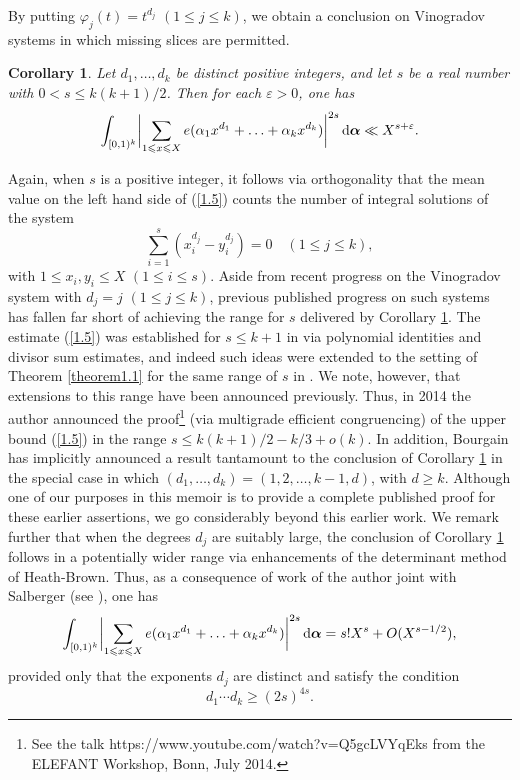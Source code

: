 \documentclass[12pt,reqno]{amsart}
\newtheorem{corollary}[theorem]{Corollary}
\theoremstyle{definition}
\theoremstyle{remark}
\numberwithin{equation}{section}
\def\alp{{\alpha}} \def\bfalp{{\boldsymbol \alpha}}
\def\eps{\varepsilon}
\def\le{\leqslant} \def\ge{\geqslant} \def\pleq{\preccurlyeq} \def\ple{\prec}
\def\d{{\,{\rm d}}}
\begin{document}
By putting $\varphi_j(t)=t^{d_j}$ $(1\le j\le k)$, we obtain a conclusion on Vinogradov 
systems in which missing slices are permitted.

\begin{corollary}\label{corollary1.2} Let $d_1,\ldots ,d_k$ be distinct positive integers, and 
let $s$ be a real number with $0<s\le k(k+1)/2$. Then for each $\eps>0$, one has
\begin{equation}\label{1.5}
\int_{[0,1)^k}\biggl| \sum_{1\le x\le X}e(\alp_1x^{d_1}+\ldots +\alp_kx^{d_k})
\biggr|^{2s}\d\bfalp \ll X^{s+\eps}.
\end{equation}
\end{corollary}

Again, when $s$ is a positive integer, it follows via orthogonality that the mean value on 
the left hand side of (\ref{1.5}) counts the number of integral solutions of the system
$$\sum_{i=1}^s(x_i^{d_j}-y_i^{d_j})=0\quad (1\le j\le k),$$
with $1\le x_i,y_i\le X$ $(1\le i\le s)$. Aside from recent progress on the Vinogradov 
system with $d_j=j$ $(1\le j\le k)$, previous published progress on such systems has 
fallen far short of achieving the range for $s$ delivered by Corollary \ref{corollary1.2}. The 
estimate (\ref{1.5}) was established for $s\le k+1$ in \cite[Theorem 1]{Woo1993} via 
polynomial identities and divisor sum estimates, and indeed such ideas were extended to 
the setting of Theorem \ref{theorem1.1} for the same range of $s$ in 
\cite[Theorem 1]{PW2002}. We note, however, that extensions to this range have been 
announced previously. Thus, in 2014 the author announced the proof\footnote{See the 
talk https://www.youtube.com/watch?v=Q5gcLVYqEks from the ELEFANT Workshop, Bonn, 
July 2014.} (via multigrade efficient congruencing) of the upper bound (\ref{1.5}) in the 
range $s\le k(k+1)/2-k/3+o(k)$. In addition, Bourgain \cite[equation (6.6)]{Bou2017} has 
implicitly announced a result tantamount to the conclusion of Corollary \ref{corollary1.2} in 
the special case in which $(d_1,\ldots ,d_k)=(1,2,\ldots ,k-1,d)$, with $d\ge k$. Although 
one of our purposes in this memoir is to provide a complete published proof for these 
earlier assertions, we go considerably beyond this earlier work. We remark further that 
when the degrees $d_j$ are suitably large, the conclusion of Corollary \ref{corollary1.2} 
follows in a potentially wider range via enhancements of the determinant method of 
Heath-Brown. Thus, as a consequence of work of the author joint with Salberger (see 
\cite[Theorems 1.3 and 5.2]{SW2010}), one has
$$\int_{[0,1)^k}\biggl| \sum_{1\le x\le X}e(\alp_1x^{d_1}+\ldots 
+\alp_kx^{d_k})\biggr|^{2s}\d\bfalp =s!X^s+O(X^{s-1/2}),$$
provided only that the exponents $d_j$ are distinct and satisfy the condition
$$d_1\cdots d_k\ge (2s)^{4s}.$$
\end{document}

